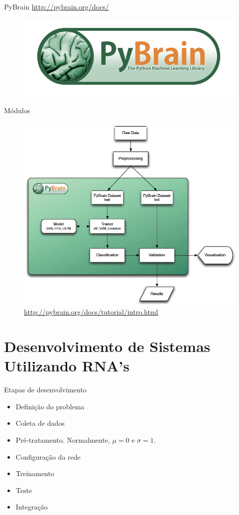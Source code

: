 \documentclass{beamer}
\begin{document}
    \begin{frame}{PyBrain}
      \url{http://pybrain.org/docs/}
      \begin{figure}[htpb]
	\includegraphics[scale=0.5]{logo_pybrain.png}
      \end{figure}
    \end{frame}
    
    \begin{frame}{Módulos}
      \begin{figure}[htpb]
	\includegraphics[scale=0.28]{dataprocessing_flowchart.jpg}
	\caption{\url{http://pybrain.org/docs/tutorial/intro.html}}
      \end{figure}
    \end{frame}
    
  \section{Desenvolvimento de Sistemas Utilizando RNA's}
    \frame{\sectionpage}
      \begin{frame}{Etapas de desenvolvimento}
      \begin{itemize}
	\item Definição do problema
	\item Coleta de dados
	\item Pré-tratamento. Normalmente, $\mu = 0$ e $\sigma = 1$.
	\item Configuração da rede
	\item Treinamento
	\item Teste
	\item Integração
      \end{itemize}
    \end{frame}
      
\end{document}
